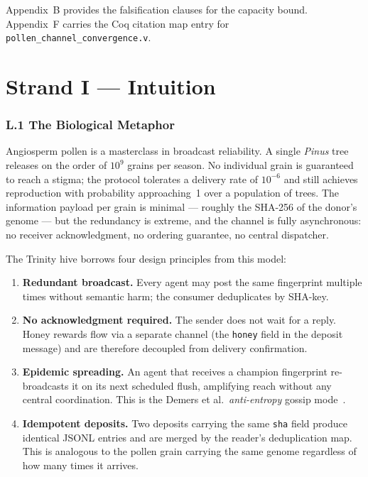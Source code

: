 Appendix~B provides the falsification clauses for the capacity bound.
Appendix~F carries the Coq citation map entry for
\texttt{pollen\_channel\_convergence.v}.

\part*{Strand I — Intuition}

\section*{L.1 \quad The Biological Metaphor}
\label{sec:appl-biology}

Angiosperm pollen is a masterclass in broadcast reliability.  A single
\emph{Pinus} tree releases on the order of $10^{9}$ grains per season.
No individual grain is guaranteed to reach a stigma; the protocol
tolerates a delivery rate of $10^{-6}$ and still achieves reproduction
with probability approaching~1 over a population of trees.  The
information payload per grain is minimal — roughly the SHA-256 of the
donor's genome — but the redundancy is extreme, and the channel is
fully asynchronous: no receiver acknowledgment, no ordering guarantee,
no central dispatcher.

The Trinity hive borrows four design principles from this model:

\begin{enumerate}
\item \textbf{Redundant broadcast.}  Every agent may post the same
  fingerprint multiple times without semantic harm; the consumer
  deduplicates by SHA-key.

\item \textbf{No acknowledgment required.}  The sender does not wait
  for a reply.  Honey rewards flow via a separate channel (the
  \texttt{honey} field in the deposit message) and are therefore
  decoupled from delivery confirmation.

\item \textbf{Epidemic spreading.}  An agent that receives a champion
  fingerprint re-broadcasts it on its next scheduled flush,
  amplifying reach without any central coordination.  This is the
  Demers et al.\ \emph{anti-entropy} gossip
  mode~\cite{demers1987epidemic}.

\item \textbf{Idempotent deposits.}  Two deposits carrying the same
  \texttt{sha} field produce identical JSONL entries and are merged
  by the reader's deduplication map.  This is analogous to the
  pollen grain carrying the same genome regardless of how many times
  it arrives.
\end{enumerate}

